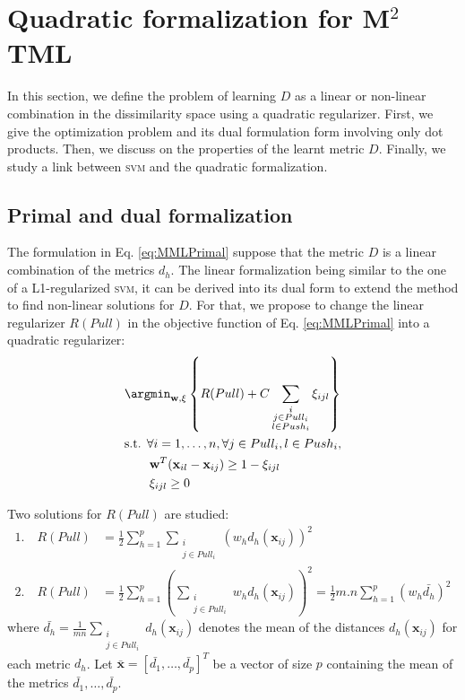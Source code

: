 \section{Quadratic formalization for M$^2$TML}
In this section, we define the problem of learning $D$ as a linear or non-linear combination in the dissimilarity space using a quadratic regularizer. First, we give the optimization problem and its dual formulation form involving only dot products. Then, we discuss on the properties of the learnt metric $D$. Finally, we study a link between \textsc{svm} and the quadratic formalization. \\

\subsection{Primal and dual formalization}
The formulation in Eq. \ref{eq:MMLPrimal} suppose that the metric $D$ is a linear combination of the metrics $d_h$. The linear formalization being similar to the one of a L1-regularized \textsc{svm}, it can be derived into its dual form to extend the method to find non-linear solutions for $D$. For that, we propose to change the linear regularizer $R(Pull)$ in the objective function of Eq. \ref{eq:MMLPrimal} into a quadratic regularizer: 
\begin{equation}
\begin{aligned}
&\displaystyle 		\argmin_{\textbf{w},\xi}
\left\lbrace 
		R(Pull)				
+	
C 			
	\sum\limits_{\substack{i \\ j \in Pull_i \\ l \in Push_i}} \xi_{ijl}
\right\rbrace \\
&\text{s.t.  } \forall i = 1, \ldots, n, \forall j \in Pull_i, l \in Push_i, \\
& \qquad \textbf{w}^T(\textbf{x}_{il}-\textbf{x}_{ij}) \geq 1-\xi_{ijl}  \\
& \qquad \xi_{ijl} \geq 0
\label{eq:MMLPrimal2} 
\end{aligned}
\end{equation}

\noindent Two solutions for $R(Pull)$ are studied:
\begin{align}
1. \quad R(Pull) & = \frac{1}{2} \sum\limits_{h=1}^{p} \sum\limits_{\substack{i \\ j \in Pull_i}} \left( w_h d_h(\textbf{x}_{ij})\right) ^2 \label{eq:regularizer1}\\
2. \quad R(Pull) 
& = \frac{1}{2} \sum\limits_{h=1}^{p} \left( \sum\limits_{\substack{i \\ j \in Pull_i}} w_h d_h(\textbf{x}_{ij})\right)^2 
= \frac{1}{2}m.n \sum\limits_{h=1}^{p} \left( w_h \bar{d_h} \right) ^2 \label{eq:regularizer2}
\end{align}
where $\bar{d_h} = \frac{1}{mn} \sum\limits_{\substack{i \\ j \in Pull_i}} d_h(\textbf{x}_{ij})$ denotes the mean of the distances $d_h(\textbf{x}_{ij})$ for each metric $d_h$. Let $\bar{\textbf{x}}=[\bar{d_1}, \ldots, \bar{d_p}]^T$ be a vector of size $p$ containing the mean of the metrics $\bar{d_1}, \ldots, \bar{d_p}$.\\

